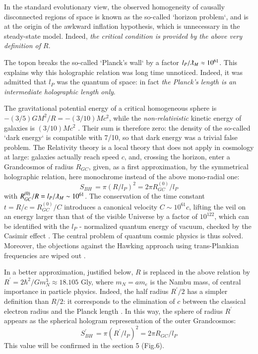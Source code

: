 \documentclass[twoside,draft]{article}
\begin{document}
\begin{sloppypar}
In the standard evolutionary view, the observed homogeneity of causally disconnected regions of space is known as the so-called `horizon problem`, and is at the origin of the awkward inflation hypothesis, which is unnecessary in the steady-state model. Indeed, \textit{the critical condition is provided by the above very definition of $R$}.

The topon breaks the so-called `Planck's wall` by a factor $l_{P}/\lambdabar_{M}\approx 10^{61}$. This explains why this holographic relation was long time unnoticed. Indeed, it was admitted that $l_{P}$ was the quantum of space: in fact \textit{the Planck's length is an intermediate holographic length only}.

The gravitational potential energy of a critical homogeneous sphere is $-(3/5)GM^{2}/R = -
(3/10)Mc^{2}$, while the \textit{non-relativistic} kinetic energy of galaxies is $(3/10)Mc^{2}$ \cite{Sanchez1}. Their sum is therefore zero: the density of the so-called `dark energy` is compatible with 7/10, so that dark energy was a trivial false problem. 
The Relativity theory is a local theory that does not apply in cosmology at large: 
galaxies actually reach speed $c$, and, crossing the horizon, enter a Grandcosmos of radius $R_{GC}$, given, as a first approximation, by the symmetrical holographic relation, here monochrome instead of the above mono-radial one:
\begin{equation}
S_{BH}\, = \pi(R/l_P )^{2} = 2\pi R^{(0)}_{GC} /l_{P}
\end{equation}
with $R^{(0)}_{GC} /R = l_{P} /\lambdabar_{M} \sim 10^{61}$. 
The conservation of the time constant $t = R/c = R^{(0)}_{GC} /C$ introduces a canonical velocity $C \sim 10^{61} c$, 
lifting the veil on an energy larger than that of the visible Universe by a factor of $10^{122}$, which can be identified with the $l_{P}$ - normalized quantum energy of vacuum, checked by the Casimir effect \cite{Duplantier}. The central problem of quantum cosmic physics is thus solved. Moreover, the objections against the Hawking approach using trans-Plankian frequencies are wiped out \cite{Damour}.

In a better approximation, justified below, $R$ is replaced in the above relation by $R^{\prime} = 2\hbar^{2}/Gm_{N}^{3}
\approx 18.105$ Gly, where $m_{N} = am_{e}$ is the Nambu mass, of central importance in particle physics. Indeed, the half radius $R^{\prime}/2$ has a simpler definition than $R/2$: it corresponds to the elimination of $c$ between the classical electron radius and the Planck length \cite{Sanchez1}. In this way, the sphere of radius $R^{\prime}$ appears 
as the spherical hologram representation of the outer Grandcosmos:
\begin{equation}
S^{\prime}_{BH}\, = \pi(R^{\prime}/l_{P})^{2} = 2\pi R_{GC} /l_{P}
\end{equation}
This value will be confirmed in the section 5 (Fig.6).


\end{sloppypar}
\end{document}

